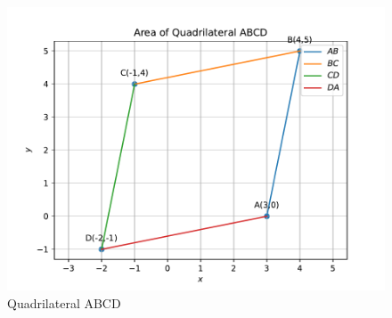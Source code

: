\documentclass[10pt]{article}
\begin{document}
\begin{figure}[H]
			\centering
			\includegraphics[width=\columnwidth]{figs/fig.pdf}
			\caption{Quadrilateral ABCD}
			\label{fig:15}
		\end{figure}
\end{document}
